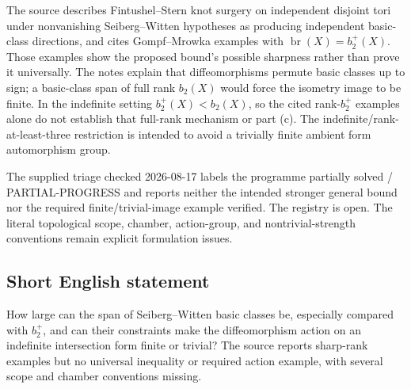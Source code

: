 \documentclass[11pt]{article}
\begin{document}
The source describes Fintushel--Stern knot surgery on independent disjoint tori under nonvanishing Seiberg--Witten hypotheses as producing independent basic-class directions, and cites Gompf--Mrowka examples with $\operatorname{br}(X)=b_2^+(X)$. Those examples show the proposed bound's possible sharpness rather than prove it universally. The notes explain that diffeomorphisms permute basic classes up to sign; a basic-class span of full rank $b_2(X)$ would force the isometry image to be finite. In the indefinite setting $b_2^+(X)<b_2(X)$, so the cited rank-$b_2^+$ examples alone do not establish that full-rank mechanism or part (c). The indefinite/rank-at-least-three restriction is intended to avoid a trivially finite ambient form automorphism group.

The supplied triage checked 2026-08-17 labels the programme partially solved / PARTIAL-PROGRESS and reports neither the intended stronger general bound nor the required finite/trivial-image example verified. The registry is open. The literal topological scope, chamber, action-group, and nontrivial-strength conventions remain explicit formulation issues.
\subsection{Short English statement}
How large can the span of Seiberg--Witten basic classes be, especially compared with $b_2^+$, and can their constraints make the diffeomorphism action on an indefinite intersection form finite or trivial? The source reports sharp-rank examples but no universal inequality or required action example, with several scope and chamber conventions missing.
\end{document}
